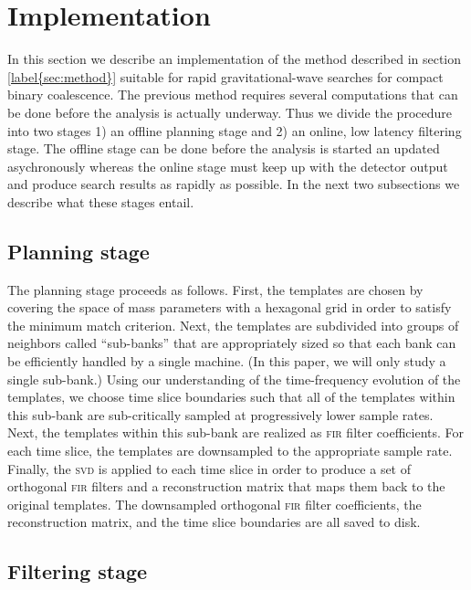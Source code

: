 \section{Implementation}

In this section we describe an implementation of the method described in
section \ref{label{sec:method}} suitable for rapid gravitational-wave searches
for compact binary coalescence.  The previous method requires several
computations that can be done before the analysis is actually underway.  Thus
we divide the procedure into two stages 1) an offline planning stage and 2) an
online, low latency filtering stage.  The offline stage can be done before the
analysis is started an updated asychronously whereas the online stage must keep
up with the detector output and produce search results as rapidly as possible.
In the next two subsections we describe what these stages entail.

\subsection{Planning stage}

The planning stage proceeds as follows.  First, the templates are chosen by
covering the space of mass parameters with a hexagonal grid
\cite{PhysRevD.76.102004} in order to satisfy the minimum match criterion.
Next, the templates are subdivided into groups of neighbors called
``sub-banks'' that are appropriately sized so that each bank can be efficiently
handled by a single machine.  (In this paper, we will only study a single
sub-bank.)  Using our understanding of the time-frequency evolution of the
templates, we choose time slice boundaries such that all of the templates
within this sub-bank are sub-critically sampled at progressively lower sample
rates.  Next, the templates within this sub-bank are realized as \textsc{fir}
filter coefficients.  For each time slice, the templates are downsampled to the
appropriate sample rate.  Finally, the \textsc{svd} is applied to each time
slice in order to produce a set of orthogonal \textsc{fir} filters and a
reconstruction matrix that maps them back to the original templates.  The
downsampled orthogonal \textsc{fir} filter coefficients, the reconstruction
matrix, and the time slice boundaries are all saved to disk.

\subsection{Filtering stage}

